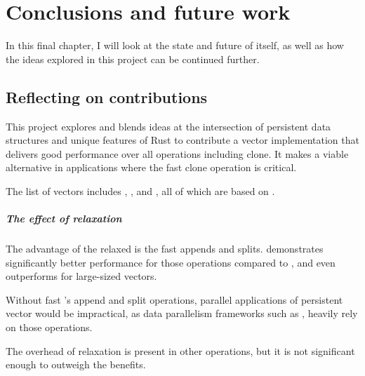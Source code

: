 \chapter{Conclusions and future work}
In this final chapter, I will look at the state and future of \pvecrs{} itself, as well as how the ideas explored in this project can be continued further.

\section{Reflecting on contributions}


This project explores and blends ideas at the intersection of persistent data structures and unique features of Rust to contribute a vector implementation that delivers good performance over all operations including clone. It makes \pvecrs{} a viable alternative in applications where the fast clone operation is critical. 

The list of vectors includes \rbvec{}, \rrbvec{}, and \pvec{}, all of which are based on \rrbtree{}. 


\paragraph{The effect of relaxation}
The advantage of the relaxed \rbtree{} is the fast appends and splits. \rrbvec{} demonstrates significantly better performance for those operations compared to \rbvec{}, and even outperforms \stdvec{} for large-sized vectors. 

Without fast \rrbvec{}'s append and split operations, parallel applications of persistent vector would be impractical, as data parallelism frameworks such as \rayon{}, heavily rely on those operations. 

The overhead of relaxation is present in other operations, but it is not significant enough to outweigh the benefits. 


